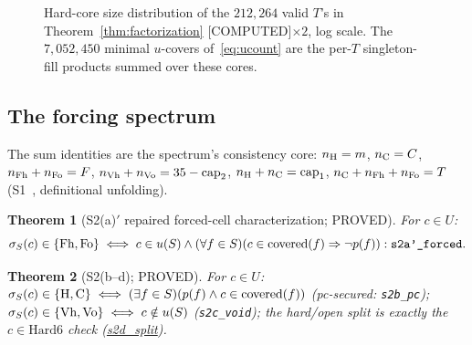 \documentclass[11pt,a4paper]{article}
\newtheorem{theorem}{Theorem}
\theoremstyle{definition}
\newcommand{\cH}{\textnormal{H}}
\newcommand{\cC}{\textnormal{C}}
\newcommand{\cFh}{\textnormal{Fh}}
\newcommand{\cFo}{\textnormal{Fo}}
\newcommand{\cVh}{\textnormal{Vh}}
\newcommand{\cVo}{\textnormal{Vo}}
\begin{document}
\begin{figure}[t]
  \centering
  \caption{Hard-core size distribution of the $212{,}264$ valid $T$'s in
    Theorem~\ref{thm:factorization} [COMPUTED]$\times2$, log scale.  The
    $7{,}052{,}450$ minimal $u$-covers of~\eqref{eq:ucount} are the per-$T$
    singleton-fill products summed over these cores.}
  \label{fig:tcensus}
\end{figure}

\subsection{The forcing spectrum}
\label{sec:spectrum}

The sum identities are the spectrum's consistency core: $n_{\cH}=m$,
$n_{\cC}=C$, $n_{\cFh}+n_{\cFo}=F$, $n_{\cVh}+n_{\cVo}=35-\mathrm{cap}_2$,
$n_{\cH}+n_{\cC}=\mathrm{cap}_1$, $n_{\cC}+n_{\cFh}+n_{\cFo}=T$
(S1~\cite{D313}, definitional unfolding).

\begin{theorem}[S2(a)$'$ repaired forced-cell characterization; PROVED]
  \label{thm:s2ap}
  For $c\in U$:
  \begin{equation}
    \label{eq:s2ap}
    \sigma_S(c)\in\{\cFh,\cFo\}\iff
    c\in u(S)\land(\forall f\in S)(c\in\mathrm{covered}(f)\Rightarrow\neg p(f)):
    \texttt{s2a'\_forced}.
  \end{equation}
\end{theorem}

\begin{theorem}[S2(b--d); PROVED]
  \label{thm:s2bcd}
  For $c\in U$: $\sigma_S(c)\in\{\cH,\cC\}\iff(\exists f\in S)(p(f)\land
  c\in\mathrm{covered}(f))$ (pc-secured: \texttt{s2b\_pc});
  $\sigma_S(c)\in\{\cVh,\cVo\}\iff c\notin u(S)$ (\texttt{s2c\_void}); the
  hard/open split is exactly the $c\in\text{Hard6}$ check
  (\url{s2d_split}).
\end{theorem}
\end{document}
